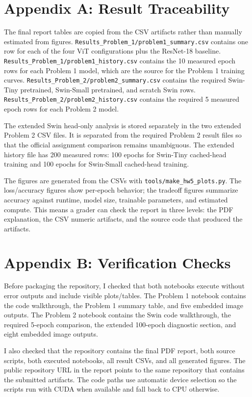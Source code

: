 \documentclass[11pt]{article}
\begin{document}
\section*{Appendix A: Result Traceability}
The final report tables are copied from the CSV artifacts rather than manually estimated from figures. \texttt{Results\_Problem\_1/problem1\_summary.csv} contains one row for each of the four ViT configurations plus the ResNet-18 baseline. \texttt{Results\_Problem\_1/problem1\_history.csv} contains the 10 measured epoch rows for each Problem 1 model, which are the source for the Problem 1 training curves. \texttt{Results\_Problem\_2/problem2\_summary.csv} contains the required Swin-Tiny pretrained, Swin-Small pretrained, and scratch Swin rows. \texttt{Results\_Problem\_2/problem2\_history.csv} contains the required 5 measured epoch rows for each Problem 2 model.

The extended Swin head-only analysis is stored separately in the two extended Problem 2 CSV files. It is separated from the required Problem 2 result files so that the official assignment comparison remains unambiguous. The extended history file has 200 measured rows: 100 epochs for Swin-Tiny cached-head training and 100 epochs for Swin-Small cached-head training.

The figures are generated from the CSVs with \texttt{tools/make\_hw5\_plots.py}. The loss/accuracy figures show per-epoch behavior; the tradeoff figures summarize accuracy against runtime, model size, trainable parameters, and estimated compute. This means a grader can check the report in three levels: the PDF explanation, the CSV numeric artifacts, and the source code that produced the artifacts.

\section*{Appendix B: Verification Checks}
Before packaging the repository, I checked that both notebooks execute without error outputs and include visible plots/tables. The Problem 1 notebook contains the code walkthrough, the Problem 1 summary table, and five embedded image outputs. The Problem 2 notebook contains the Swin code walkthrough, the required 5-epoch comparison, the extended 100-epoch diagnostic section, and eight embedded image outputs.

I also checked that the repository contains the final PDF report, both source scripts, both executed notebooks, all result CSVs, and all generated figures. The public repository URL in the report points to the same repository that contains the submitted artifacts. The code paths use automatic device selection so the scripts run with CUDA when available and fall back to CPU otherwise.
\end{document}
